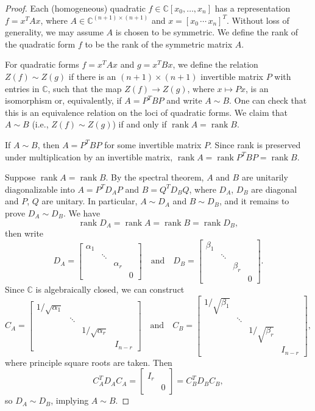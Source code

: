 \documentclass[12pt]{article}
\newcommand{\isp}[1]{\quad\text{#1}\quad}
\newcommand{\C}{\mathbb{C}}
\newcommand{\<}{\langle}
\renewcommand{\>}{\rangle}
\DeclareMathOperator{\rank}{rank}
\newcommand{\mat}[1]{\begin{bmatrix}#1\end{bmatrix}}
\begin{document}
\begin{proof}
    Each (homogeneous) quadratic $f \in \C[x_0, \dots, x_n]$ has a representation $f = x^TAx$, where $A \in \C^{(n+1) \times (n+1)}$ and $x = [x_0 \, \cdots \, x_n]^T$. Without loss of generality, we may assume $A$ is chosen to be symmetric. We define the rank of the quadratic form $f$ to be the rank of the symmetric matrix $A$.

    For quadratic forms $f = x^TAx$ and $g = x^TBx$, we define the relation $Z(f) \sim Z(g)$ if there is an $(n+1)\times(n+1)$ invertible matrix $P$ with entries in $\C$, such that the map $Z(f) \to Z(g)$, where $x \mapsto Px$, is an isomorphism or, equivalently, if $A = P^TBP$ and write $A \sim B$. One can check that this is an equivalence relation on the loci of quadratic forms. We claim that $A \sim B$ (i.e., $Z(f) \sim Z(g)$) if and only if $\rank A = \rank B$.
    
    If $A \sim B$, then $A = P^TBP$ for some invertible matrix $P$. Since rank is preserved under multiplication by an invertible matrix, $\rank A = \rank P^TBP = \rank B$.

    Suppose $\rank A = \rank B$. By the spectral theorem, $A$ and $B$ are unitarily diagonalizable into $A = P^TD_AP$ and $B = Q^TD_BQ$, where $D_A$, $D_B$ are diagonal and $P$, $Q$ are unitary. In particular, $A \sim D_A$ and $B \sim D_B$, and it remains to prove $D_A \sim D_B$. We have
    \[
        \rank D_A = \rank A = \rank B = \rank D_B,
    \]
    then write
    \[
        D_A = \mat{
            \alpha_1 \\
                & \ddots \\
                &   & \alpha_r \\
                &   &   & 0
        }
        \isp{and}
        D_B = \mat{
            \beta_1 \\
                & \ddots \\
                &   & \beta_r \\
                &   &   & 0
        }.
    \]
    Since $\C$ is algebraically closed, we can construct
    \[
        C_A = \mat{
            1/\sqrt{\alpha_1} \\
                & \ddots \\
                &   & 1/\sqrt{\alpha_r} \\
                &   &   & I_{n-r}
        }
        \isp{and}
        C_B = \mat{
            1/\sqrt{\beta_1} \\
                & \ddots \\
                &   & 1/\sqrt{\beta_r} \\
                &   &   & I_{n-r}
        },
    \]
    where principle square roots are taken. Then
    \[
        C_A^TD_AC_A = \mat{
            I_r \\
                & 0
        }
        = C_B^TD_BC_B,
    \]
    so $D_A \sim D_B$, implying $A \sim B$.

\end{proof}
\end{document}
